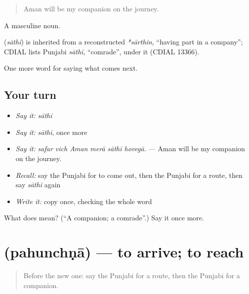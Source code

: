\begin{quote}
Aman will be my companion on the journey.
\end{quote}

A masculine noun.

\begin{cousinweb}
\textbf{} (\emph{sāthī}) is inherited from a reconstructed \emph{*sārthin}, \textquotedblleft{}having part in a company\textquotedblright{}; CDIAL lists Punjabi \emph{sāthī}, \textquotedblleft{}comrade\textquotedblright{}, under it (CDIAL 13366).
\end{cousinweb}

\begin{grammarlens}[title={What you've built}]
One more word for saying what comes next.
\end{grammarlens}

\subsection*{Your turn}
\begin{itemize}
\raggedright
  \item \emph{Say it:} \emph{sāthī}
  \item \emph{Say it:} \emph{sāthī}, once more
  \item \emph{Say it:} \emph{safar vich Aman merā sāthī hovegā.} — Aman will be my companion on the journey.
  \item \emph{Recall:} say the Punjabi for to come out, then the Punjabi for a route, then say \emph{sāthī} again
  \item \emph{Write it:} copy \textbf{} once, checking the whole word
\end{itemize}

\begin{tcolorbox}[breakable,colback=teal!4,colframe=teal!35!black,title={Before you move on}]
What does  mean? (\textquotedblleft{}A companion; a comrade\textquotedblright{}.) Say it once more.
\end{tcolorbox}
\section[\texorpdfstring{\pa{ਪਹੁੰਚਣਾ} (pahunchṇā)}{ਪਹੁੰਚਣਾ (pahunchṇā)}]{ (pahunchṇā) — to arrive; to reach}

\label{lesson:PA-C283-pahunchna}



\begin{quote}
Before the new one: say the Punjabi for a route, then the Punjabi for a companion.
\end{quote}


